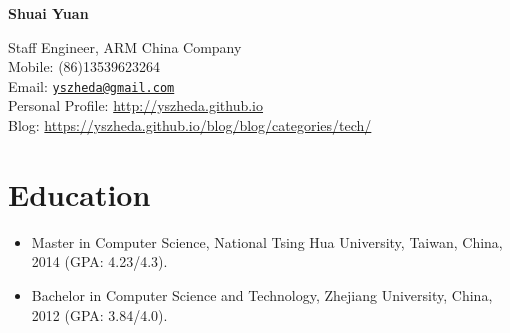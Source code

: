 \documentclass[letterpaper]{article}
\def\name{Shuai Yuan}
\begin{document}
\centerline{\huge\bf \name} \vspace{0.25in}
\begin{minipage}[t]{0.8\textwidth}
    Staff Engineer, ARM China Company \\
    Mobile: (86)13539623264   \\
    Email: \href{mailto:yszheda@gmail.com}{\tt yszheda@gmail.com}\\
    Personal Profile: \url{http://yszheda.github.io} \\
    Blog: \url{https://yszheda.github.io/blog/blog/categories/tech/}
\end{minipage}

\section*{Education}
\begin{itemize}
    \item Master in Computer Science, National Tsing Hua University, Taiwan, China, 2014 (GPA: 4.23/4.3).
    \item Bachelor in Computer Science and Technology, Zhejiang University, China, 2012 (GPA: 3.84/4.0).
\end{itemize}
\end{document}

